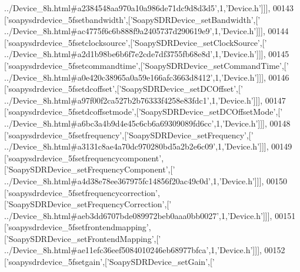 \begin{DoxyCode}
{      ../Device\_8h.html#a2384548aa970a10a986de71dc9d8d3d5'},1,\textcolor{stringliteral}{'Device.h'}]]],
00143   [\textcolor{stringliteral}{'soapysdrdevice\_5fsetbandwidth'},[\textcolor{stringliteral}{'SoapySDRDevice\_setBandwidth'},[\textcolor{stringliteral}{'
      ../Device\_8h.html#ac4775f6c6b888f9a2405737d290619e9'},1,\textcolor{stringliteral}{'Device.h'}]]],
00144   [\textcolor{stringliteral}{'soapysdrdevice\_5fsetclocksource'},[\textcolor{stringliteral}{'SoapySDRDevice\_setClockSource'},[\textcolor{stringliteral}{'
      ../Device\_8h.html#a2d1b98be6b6f7e2cde7df3755fb68e8d'},1,\textcolor{stringliteral}{'Device.h'}]]],
00145   [\textcolor{stringliteral}{'soapysdrdevice\_5fsetcommandtime'},[\textcolor{stringliteral}{'SoapySDRDevice\_setCommandTime'},[\textcolor{stringliteral}{'
      ../Device\_8h.html#a0e420c38965a0a59e166afc3663d8412'},1,\textcolor{stringliteral}{'Device.h'}]]],
00146   [\textcolor{stringliteral}{'soapysdrdevice\_5fsetdcoffset'},[\textcolor{stringliteral}{'SoapySDRDevice\_setDCOffset'},[\textcolor{stringliteral}{'
      ../Device\_8h.html#a97f00f2ca527b2b76333f4258e83fdc1'},1,\textcolor{stringliteral}{'Device.h'}]]],
00147   [\textcolor{stringliteral}{'soapysdrdevice\_5fsetdcoffsetmode'},[\textcolor{stringliteral}{'SoapySDRDevice\_setDCOffsetMode'},[\textcolor{stringliteral}{'
      ../Device\_8h.html#a6bc3a4b9d4e45c6cb6a69309089fd6cc'},1,\textcolor{stringliteral}{'Device.h'}]]],
00148   [\textcolor{stringliteral}{'soapysdrdevice\_5fsetfrequency'},[\textcolor{stringliteral}{'SoapySDRDevice\_setFrequency'},[\textcolor{stringliteral}{'
      ../Device\_8h.html#a3131c8ae4a70dc970280bd5a2b2e6c09'},1,\textcolor{stringliteral}{'Device.h'}]]],
00149   [\textcolor{stringliteral}{'soapysdrdevice\_5fsetfrequencycomponent'},[\textcolor{stringliteral}{'SoapySDRDevice\_setFrequencyComponent'},[\textcolor{stringliteral}{'
      ../Device\_8h.html#a4d38e78ee367975fc14856f20ac49c0d'},1,\textcolor{stringliteral}{'Device.h'}]]],
00150   [\textcolor{stringliteral}{'soapysdrdevice\_5fsetfrequencycorrection'},[\textcolor{stringliteral}{'SoapySDRDevice\_setFrequencyCorrection'},[\textcolor{stringliteral}{'
      ../Device\_8h.html#aeb3dd6707bde089972beb0aaa0bb0027'},1,\textcolor{stringliteral}{'Device.h'}]]],
00151   [\textcolor{stringliteral}{'soapysdrdevice\_5fsetfrontendmapping'},[\textcolor{stringliteral}{'SoapySDRDevice\_setFrontendMapping'},[\textcolor{stringliteral}{'
      ../Device\_8h.html#ae11efc36eef5084010246eb68977bfca'},1,\textcolor{stringliteral}{'Device.h'}]]],
00152   [\textcolor{stringliteral}{'soapysdrdevice\_5fsetgain'},[\textcolor{stringliteral}{'SoapySDRDevice\_setGain'},[\textcolor{stringliteral}{'
}
\end{DoxyCode}
